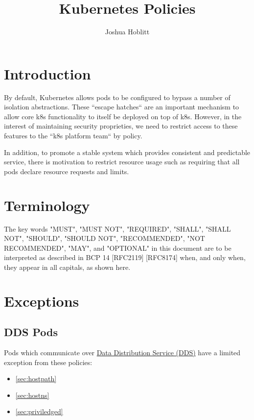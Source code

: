 \documentclass[PMO,authoryear,toc]{lsstdoc}
\title{Kubernetes Policies}
\author{%
Joshua Hoblitt
}
\date{\vcsDate}
\begin{document}
\maketitle

\section{Introduction}\label{sec:intro}

By default, Kubernetes allows pods to be configured to bypass a number of isolation abstractions.
These ``escape hatches`` are an important mechanism to allow core k8s functionality to itself be deployed on top of k8s.
However, in the interest of maintaining security proprieties, we need to restrict access to these features to the ``k8s platform team`` by policy.

In addition, to promote a stable system which provides consistent and predictable service, there is motivation to restrict resource usage such as requiring that all pods declare resource requests and limits.

\section{Terminology}\label{sec:term}

The key words "MUST", "MUST NOT", "REQUIRED", "SHALL", "SHALL NOT", "SHOULD", "SHOULD NOT", "RECOMMENDED", "NOT RECOMMENDED", "MAY", and "OPTIONAL" in this document are to be interpreted as described in BCP 14 [RFC2119] [RFC8174] when, and only when, they appear in all capitals, as shown here.

\section{Exceptions}\label{sec:except}

\subsection{DDS Pods}

Pods which communicate over \href{https://en.wikipedia.org/wiki/Data_Distribution_Service}{Data Distribution Service (DDS)} have a limited exception from these policies:

\begin{itemize}
  \item \ref{sec:hostpath}
  \item \ref{sec:hostns}
  \item \ref{sec:priviledged}
\end{itemize}
\end{document}
